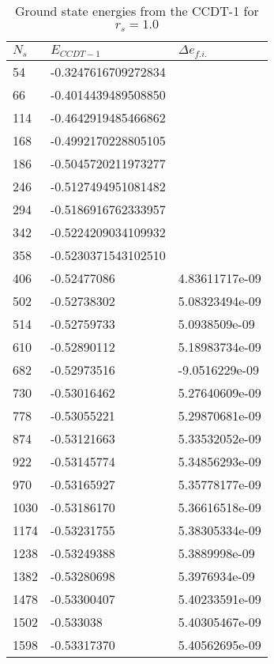 \begin{table}[h]
\caption{Ground state energies from the CCDT-1 for $r_s = 1.0$}
\begin{center}
\begin{threeparttable}
\begin{tabular}{l l l}
    \toprule
    $N_s$ & $E_{CCDT-1}$ & $\Delta e_{f.i.}$ \\ \hline
54  & -0.3247616709272834  \\
66   &-0.4014439489508850  \\
114  &-0.4642919485466862 \\
168  &-0.4992170228805105 \\
186  &-0.5045720211973277 \\
246  &-0.5127494951081482 \\
294  &-0.5186916762333957 \\
342 & -0.5224209034109932 \\
358 & -0.5230371543102510 \\ \hline
406  &-0.52477086       &   4.83611717e-09 \\
502  &-0.52738302       &   5.08323494e-09\\
514 & -0.52759733         &  5.0938509e-09\\
610 & -0.52890112        &  5.18983734e-09 \\    
682 & -0.52973516        &  -9.0516229e-09  \\   
730 & -0.53016462          & 5.27640609e-09\\     
778 & -0.53055221        &  5.29870681e-09 \\    
874 & -0.53121663        &  5.33532052e-09 \\    
922 & -0.53145774        &  5.34856293e-09 \\   
970 & -0.53165927        &  5.35778177e-09 \\    
1030 &-0.53186170       &   5.36616518e-09\\     
1174 &-0.53231755        &  5.38305334e-09\\     
1238 &-0.53249388        &  5.3889998e-09  \\    
1382 &-0.53280698        &  5.3976934e-09  \\   
1478 &-0.53300407        &  5.40233591e-09\\     
1502&  -0.533038         &    5.40305467e-09  \\
1598 &-0.53317370        &  5.40562695e-09\\   
\bottomrule
\end{tabular}

\end{threeparttable}
\end{center}
\end{table}
